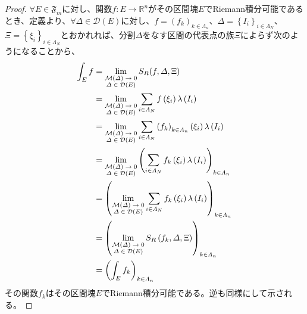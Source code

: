 \documentclass[dvipdfmx]{jsarticle}
\begin{document}
\begin{proof}
$\forall E \in \mathfrak{F}_{m}$に対し、関数$f:E \rightarrow \mathbb{R}^{n}$がその区間塊$E$でRiemann積分可能であるとき、定義より、$\forall\varDelta \in \mathcal{D}(E)$に対し、$f = \left( f_{k} \right)_{k \in \varLambda_{n}}$、$\varDelta = \left\{ I_{i} \right\}_{i \in \varLambda_{N}}$、$\Xi = \left\{ \xi_{i} \right\}_{i \in \varLambda_{N}}$とおかれれば、分割$\varDelta$をなす区間の代表点の族$\Xi$によらず次のようになることから、
\begin{align*}
\int_{E} f &= \lim_{\scriptsize \begin{matrix}
\mathcal{M}(\varDelta) \rightarrow 0 \\
\varDelta \in \mathcal{D}(E) \\
\end{matrix}}{S_{R}(f,\varDelta,\Xi)}\\
&= \lim_{\scriptsize \begin{matrix}
\mathcal{M}(\varDelta) \rightarrow 0 \\
\varDelta \in \mathcal{D}(E) \\
\end{matrix}}{\sum_{i \in \varLambda_{N}} {f\left( \xi_{i} \right)\lambda\left( I_{i} \right)}}\\
&= \lim_{\scriptsize \begin{matrix}
\mathcal{M}(\varDelta) \rightarrow 0 \\
\varDelta \in \mathcal{D}(E) \\
\end{matrix}}{\sum_{i \in \varLambda_{N}} {\left( f_{k} \right)_{k \in \varLambda_{n}}\left( \xi_{i} \right)\lambda\left( I_{i} \right)}}\\
&= \lim_{\scriptsize \begin{matrix}
\mathcal{M}(\varDelta) \rightarrow 0 \\
\varDelta \in \mathcal{D}(E) \\
\end{matrix}}\left( \sum_{i \in \varLambda_{N}} {f_{k}\left( \xi_{i} \right)\lambda\left( I_{i} \right)} \right)_{k \in \varLambda_{n}}\\
&= \left( \lim_{\scriptsize \begin{matrix}
\mathcal{M}(\varDelta) \rightarrow 0 \\
\varDelta \in \mathcal{D}(E) \\
\end{matrix}}{\sum_{i \in \varLambda_{N}} {f_{k}\left( \xi_{i} \right)\lambda\left( I_{i} \right)}} \right)_{k \in \varLambda_{n}}\\
&= \left( \lim_{\scriptsize \begin{matrix}
\mathcal{M}(\varDelta) \rightarrow 0 \\
\varDelta \in \mathcal{D}(E) \\
\end{matrix}}{S_{R}\left( f_{k},\varDelta,\Xi \right)} \right)_{k \in \varLambda_{n}}\\
&= \left( \int_{E} f_{k} \right)_{k \in \varLambda_{n}}
\end{align*}
その関数$f_{k}$はその区間塊$E$でRiemann積分可能である。逆も同様にして示される。
\end{proof}
\end{document}
